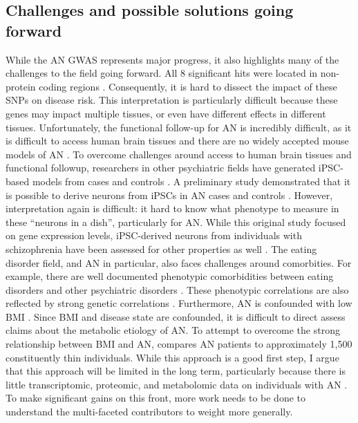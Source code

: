 \subsection{Challenges and possible solutions going forward}
While the AN GWAS represents major progress, it also highlights many of the challenges to the field going forward. All 8 significant hits were located in non-protein coding regions \cite{RN4115}. Consequently, it is hard to dissect the impact of these SNPs on disease risk. This interpretation is particularly difficult because these genes may impact multiple tissues, or even have different effects in different tissues. Unfortunately, the functional follow-up for AN is incredibly difficult, as it is difficult to access human brain tissues and there are no widely accepted mouse models of AN \cite{RN1060}.  
To overcome challenges around access to human brain tissues and functional followup, 
researchers in other psychiatric fields have generated iPSC-based models from cases and controls \cite{RN2029, RN2026}. A preliminary study demonstrated that it is possible to derive neurons from iPSCs in AN cases and controls \cite{RN2030}. However, interpretation again is difficult: it hard to know what phenotype to measure in these ``neurons in a dish'', particularly for AN. While this original study focused on gene expression levels, iPSC-derived neurons from individuals with schizophrenia have been assessed for other properties as well \cite{RN2022}. 
	The eating disorder field, and AN in particular, also faces challenges around comorbities. For example, there are well documented phenotypic comorbidities between eating disorders and other psychiatric disorders \cite{RN34}. These phenotypic correlations are also reflected by strong genetic correlations \cite{RN4568}. Furthermore, AN is confounded with low BMI \cite{RN4522}. Since BMI and disease state are confounded, it is difficult to direct assess claims about the metabolic etiology of AN. To attempt to overcome the strong relationship between BMI and AN, \cite{RN4568} compares AN patients to approximately 1,500 constituently thin individuals. While this approach is a good first step, I argue that this approach will be limited in the long term, particularly because there is little transcriptomic, proteomic, and metabolomic data on individuals with AN \cite{RN1411}. To make significant gains on this front, more work needs to be done to understand the multi-faceted contributors to weight more generally.  
